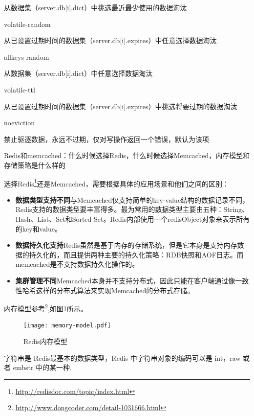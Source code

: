 \documentclass[8pt]{book}
\makeatletter
\numberwithin{dummy}{section}
\theoremstyle{ocrenumbox}
\theoremstyle{blacknumex}
\theoremstyle{blacknumbox}
\theoremstyle{ocrenum}
\renewcommand{\subsubsection}{\@startsection {subsubsection}{3}{\z@}
	{-2ex \@plus -0.1ex \@minus -.2ex}
	{.2ex \@plus.2ex }
	{\normalfont\small\sffamily\bfseries}}
\makeatother
\begin{document}
从数据集（server.db[i].dict）中挑选最近最少使用的数据淘汰

volatile-random

从已设置过期时间的数据集（server.db[i].expires）中任意选择数据淘汰

allkeys-random

从数据集（server.db[i].dict）中任意选择数据淘汰

volatile-ttl

从已设置过期时间的数据集（server.db[i].expires）中挑选将要过期的数据淘汰

noeviction

禁止驱逐数据，永远不过期，仅对写操作返回一个错误，默认为该项

\subsubsection{Redis和memcached：什么时候选择Redis，什么时候选择Memcached，内存模型和存储策略是什么样的}

选择Redis\footnote{\url{http://redisdoc.com/topic/index.html}}还是Memcached，需要根据具体的应用场景和他们之间的区别：

\begin{itemize}
\item {\textbf{数据类型支持不同}}与Memcached仅支持简单的key-value结构的数据记录不同，Redis支持的数据类型要丰富得多。最为常用的数据类型主要由五种：String、Hash、List、Set和Sorted Set。Redis内部使用一个redisObject对象来表示所有的key和value。
\item {\textbf{数据持久化支持}}Redis虽然是基于内存的存储系统，但是它本身是支持内存数据的持久化的，而且提供两种主要的持久化策略：RDB快照和AOF日志。而memcached是不支持数据持久化操作的。
\item {\textbf{集群管理不同}}Memcached本身并不支持分布式，因此只能在客户端通过像一致性哈希这样的分布式算法来实现Memcached的分布式存储。
\end{itemize}                                  

内存模型参考\footnote{\url{http://www.dongcoder.com/detail-1031666.html}},如图\ref{fig:redismemorymodel}所示。

\begin{figure}[htbp]
	\centering
	\texttt{[image: memory-model.pdf]}
	\caption{Redis内存模型}
	\label{fig:redismemorymodel}
\end{figure}

字符串是 Redis最基本的数据类型，Redis 中字符串对象的编码可以是 int，raw 或者 embstr 中的某一种.
\end{document}
